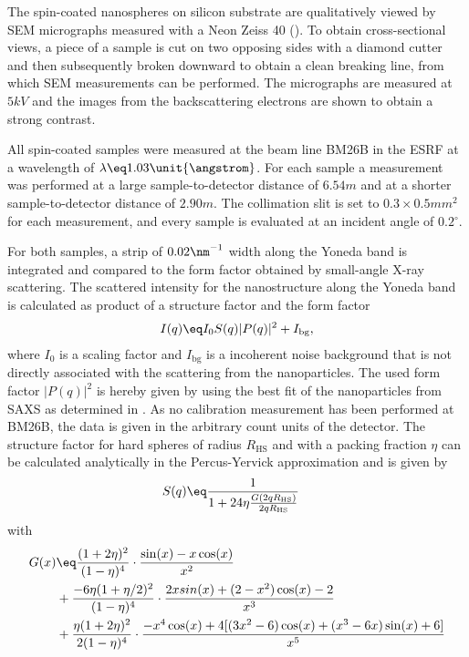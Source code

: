 \documentclass[\main/dresen_thesis.tex]{subfiles}
\begin{document}
    The spin-coated nanospheres on silicon substrate are qualitatively viewed by SEM micrographs measured with a Neon Zeiss 40 ().
    To obtain cross-sectional views, a piece of a sample is cut on two opposing sides with a diamond cutter and then subsequently broken downward to obtain a clean breaking line, from which SEM measurements can be performed.
    The micrographs are measured at $5 \unit{kV}$ and the images from the backscattering electrons are shown to obtain a strong contrast.

    All spin-coated samples were measured at the beam line BM26B  in the ESRF at a wavelength of $\lambda \eq 1.03 \unit{\angstrom}$.
    For each sample a measurement was performed at a large sample-to-detector distance of $6.54 \unit{m}$ and at a shorter sample-to-detector distance of $2.90 \unit{m}$.
    The collimation slit is set to $0.3 \times 0.5 \unit{mm^2}$ for each measurement, and every sample is evaluated at an incident angle of $0.2 \unit{^\circ}$.

    For both samples, a strip of $0.02 \nm^{-1}$ width along the Yoneda band is integrated and compared to the form factor obtained by small-angle X-ray scattering.
    The scattered intensity for the nanostructure along the Yoneda band is calculated as product of a structure factor and the form factor
    \begin{align}
      I(q) \eq I_0 S(q) |P(q)|^2 + I_\mathrm{bg},
    \end{align}
    where $I_0$ is a scaling factor and $I_\mathrm{bg}$ is a incoherent noise background that is not directly associated with the scattering from the nanoparticles.
    The used form factor $|P(q)|^2$ is hereby given by using the best fit of the nanoparticles from SAXS as determined in .
    As no calibration measurement has been performed at BM26B, the data is given in the arbitrary count units of the detector.
    The structure factor for hard spheres of radius $R_\mathrm{HS}$ and with a packing fraction $\eta$ can be calculated analytically in the Percus-Yervick approximation \cite{Percus_1958_Analy, Wertheim_1963_Exact, Pedersen_1997_Analy} and is given by
    \begin{align}
      S(q) &\eq \frac{1}{1 + 24 \eta \frac{G(2 q R_\mathrm{HS})}{2 q R_\mathrm{HS}} }
    \end{align}
    with
    \begin{align}
      \begin{split}
        G(x)   &\eq \frac{(1 + 2\eta )^2}{(1 - \eta )^4} \cdot \frac{ \sin(x) - x \cos(x)}{x^2}\\
               & + \frac {-6 \eta (1 + \eta / 2)^2}{(1 - \eta )^4} \cdot \frac{2 x sin(x) + (2 - x^2) \cos(x) - 2}{x^3}\\
               & + \frac{\eta (1 + 2\eta )^2}{2(1 - \eta )^4} \cdot \frac{-x^4 \cos(x) + 4 [(3 x^2 - 6) \cos(x) +(x^3 - 6 x) \sin(x) + 6]}{x^5}\\
      \end{split}
    \end{align}
\end{document}
